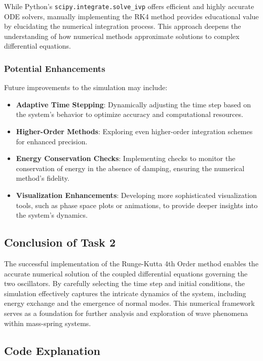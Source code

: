 \documentclass[12pt]{report} %
\begin{document}
    While Python's \texttt{scipy.integrate.solve\_ivp} offers efficient and highly accurate ODE solvers, manually implementing the RK4 method provides educational value by elucidating the numerical integration process. This approach deepens the understanding of how numerical methods approximate solutions to complex differential equations.
    
    \subsubsection{Potential Enhancements}
    
    Future improvements to the simulation may include:
    \begin{itemize}
        \item \textbf{Adaptive Time Stepping}: Dynamically adjusting the time step based on the system's behavior to optimize accuracy and computational resources.
        \item \textbf{Higher-Order Methods}: Exploring even higher-order integration schemes for enhanced precision.
        \item \textbf{Energy Conservation Checks}: Implementing checks to monitor the conservation of energy in the absence of damping, ensuring the numerical method's fidelity.
        \item \textbf{Visualization Enhancements}: Developing more sophisticated visualization tools, such as phase space plots or animations, to provide deeper insights into the system's dynamics.
    \end{itemize}
    
    \subsection{Conclusion of Task 2}
    \label{subsec:part1_task2_conclusion}
    
    The successful implementation of the Runge-Kutta 4th Order method enables the accurate numerical solution of the coupled differential equations governing the two oscillators. By carefully selecting the time step and initial conditions, the simulation effectively captures the intricate dynamics of the system, including energy exchange and the emergence of normal modes. This numerical framework serves as a foundation for further analysis and exploration of wave phenomena within mass-spring systems.
    
    \newpage
    \subsection{Code Explanation}
    \label{subsec:part1_task2_code_explanation}
    
\end{document}
